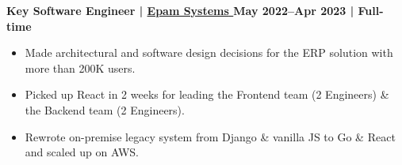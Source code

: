 \textbf{Key Software Engineer | 
\href{https://www.epam.com/}{
    {Epam Systems} 
} \hfill May 2022--Apr 2023 | Full-time}

\par
\begin{itemize}[label=$\bullet$]
    \item Made architectural and software design decisions for the ERP solution with more than 200K users.
    \item Picked up React in 2 weeks for leading the Frontend team (2 Engineers) & the Backend team (2 Engineers).
    \item Rewrote on-premise legacy system from Django \& vanilla JS to Go \& React and scaled up on AWS. 
    \newline
\end{itemize}
\par